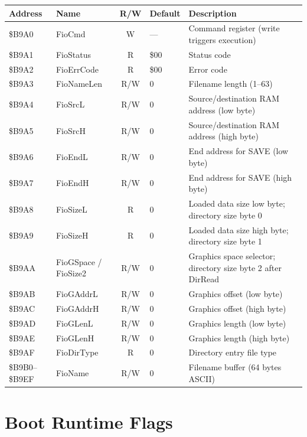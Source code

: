 \begin{center}
\small
\begin{tabular}{@{}llcll@{}}
\toprule
\textbf{Address} & \textbf{Name} & \textbf{R/W} & \textbf{Default} & \textbf{Description} \\
\midrule
\$B9A0 & FioCmd      & W   & ---  & Command register (write triggers execution) \\
\$B9A1 & FioStatus   & R   & \$00 & Status code \\
\$B9A2 & FioErrCode  & R   & \$00 & Error code \\
\$B9A3 & FioNameLen  & R/W & 0    & Filename length (1--63) \\
\$B9A4 & FioSrcL     & R/W & 0    & Source/destination RAM address (low byte) \\
\$B9A5 & FioSrcH     & R/W & 0    & Source/destination RAM address (high byte) \\
\$B9A6 & FioEndL     & R/W & 0    & End address for SAVE (low byte) \\
\$B9A7 & FioEndH     & R/W & 0    & End address for SAVE (high byte) \\
\$B9A8 & FioSizeL    & R   & 0    & Loaded data size low byte; directory size byte 0 \\
\$B9A9 & FioSizeH    & R   & 0    & Loaded data size high byte; directory size byte 1 \\
\$B9AA & FioGSpace / FioSize2 & R/W & 0 & Graphics space selector; directory size byte 2 after DirRead \\
\$B9AB & FioGAddrL   & R/W & 0    & Graphics offset (low byte) \\
\$B9AC & FioGAddrH   & R/W & 0    & Graphics offset (high byte) \\
\$B9AD & FioGLenL    & R/W & 0    & Graphics length (low byte) \\
\$B9AE & FioGLenH    & R/W & 0    & Graphics length (high byte) \\
\$B9AF & FioDirType  & R   & 0    & Directory entry file type \\
\$B9B0--\$B9EF & FioName & R/W & 0 & Filename buffer (64 bytes ASCII) \\
\bottomrule
\end{tabular}
\end{center}

\section{Boot Runtime Flags}
\label{sec:boot-runtime-flags}

